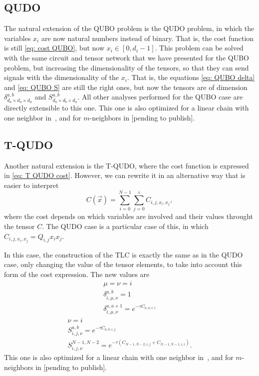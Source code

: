 \subsection{QUDO}
The natural extension of the QUBO problem is the QUDO problem, in which the variables $x_i$ are now natural numbers instead of binary. That is, the cost function is still \eqref{eq: cost QUBO}, but now $x_i\in[0,d_i-1]$. This problem can be solved with the same circuit and tensor network that we have presented for the QUBO problem, but increasing the dimensionality of the tensors, so that they can send signals with the dimensionality of the $x_i$. That is, the equations \eqref{eq: QUBO delta} and \eqref{eq: QUBO S} are still the right ones, but now the tensors are of dimension $\delta^{a,b}_{d_a\times d_a\times d_a}$ and $S^{a,b}_{d_a\times d_b\times d_a}$. All other analyses performed for the QUBO case are directly extensible to this one. This one is also optimized for a linear chain with one neighbor in~\cite{QUBO_Tridiagonal}, and for $m$-neighbors in {\color{red} [pending to publish]}.

\subsection{T-QUDO}
Another natural extension is the T-QUDO, where the cost function is expressed in \eqref{eq: T QUDO cost}. However, we can rewrite it in an alternative way that is easier to interpret
\begin{equation}
    C(\vec{x}) = \sum_{i=0}^{N-1}\sum_{j=0}^{i} C_{i,j,x_i,x_j},
\end{equation}
where the cost depends on which variables are involved and their values throught the tensor $C$. The QUDO case is a particular case of this, in which $C_{i,j,x_i,x_j} = Q_{i,j}x_ix_j$.

In this case, the construction of the TLC is exactly the same as in the QUDO case, only changing the value of the tensor elements, to take into account this form of the cost expression. The new values are
\begin{equation}
    \begin{gathered}
        \mu = \nu = i\\
        \delta^{a,b}_{i,\mu,\nu} = 1\\
        \delta^{a,a+1}_{i,\mu,\nu} = e^{-\tau C_{a,a,i,i}}
    \end{gathered}
\end{equation}
\begin{equation}
    \begin{gathered}
        \nu = i\\
        S^{a,b}_{i,j,\nu} = e^{-\tau C_{a,b,i,j}}\\
        S^{N-1,N-2}_{i,j,\nu} = e^{-\tau (C_{N-1,N-2,i,j}+C_{N-1,N-1,i,i})}.
    \end{gathered}
\end{equation}
 This one is also optimized for a linear chain with one neighbor in~\cite{QUBO_Tridiagonal}, and for $m$-neighbors in {\color{red} [pending to publish]}.

